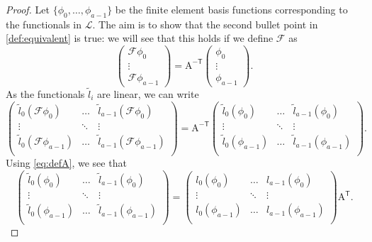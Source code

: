 \documentclass[sn-mathphys-num]{sn-jnl}%
\theoremstyle{thmstyleone}%
\newcommand{\dualbasis}{\mathcal{L}}
\newcommand{\mat}[1]{\boldsymbol{\mathrm{#1}}}
\theoremstyle{thmstyletwo}%
\theoremstyle{thmstylethree}%
\begin{document}
\begin{proof}
Let $\{\phi_0,\dots,\phi_{a-1}\}$ be the finite element basis functions corresponding to the functionals in $\dualbasis$.
The aim is to show that the second bullet point in \cref{def:equivalent} is true: we will see that
this holds if we define $\mathcal{F}$ as
\[
\begin{pmatrix}\mathcal{F}\phi_0\\\vdots\\\mathcal{F}\phi_{a-1}\end{pmatrix}
=\mat{A}^{-\mathsf{T}}
\begin{pmatrix}\phi_0\\\vdots\\\phi_{a-1}\end{pmatrix}.
\]
As the functionals $\tilde{l}_i$ are linear, we can write
\begin{equation}
\begin{pmatrix}
\tilde{l}_0(\mathcal{F}\phi_0)&\dots&\tilde{l}_{a-1}(\mathcal{F}\phi_0)\\
\vdots&\ddots&\vdots\\
\tilde{l}_0(\mathcal{F}\phi_{a-1})&\dots&\tilde{l}_{a-1}(\mathcal{F}\phi_{a-1})\\
\end{pmatrix}
=
\mat{A}^{-\mathsf{T}}
\begin{pmatrix}
\tilde{l}_0(\phi_0)&\dots&\tilde{l}_{a-1}(\phi_0)\\
\vdots&\ddots&\vdots\\
\tilde{l}_0(\phi_{a-1})&\dots&\tilde{l}_{a-1}(\phi_{a-1})\\
\end{pmatrix}.\label{eq:first_to_combine}
\end{equation}
Using \cref{eq:defA}, we see that
\begin{equation}
\begin{pmatrix}
\tilde{l}_0(\phi_0)&\dots&\tilde{l}_{a-1}(\phi_0)\\
\vdots&\ddots&\vdots\\
\tilde{l}_0(\phi_{a-1})&\dots&\tilde{l}_{a-1}(\phi_{a-1})\\
\end{pmatrix}
=
\begin{pmatrix}
l_0(\phi_0)&\dots&l_{a-1}(\phi_0)\\
\vdots&\ddots&\vdots\\
l_0(\phi_{a-1})&\dots&l_{a-1}(\phi_{a-1})\\
\end{pmatrix}
\mat{A}^\mathsf{T}.\label{eq:second_to_combine}
\end{equation}

\end{proof}
\end{document}
